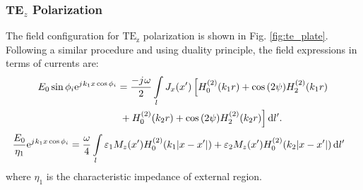 \subsubsection{TE$_z$ Polarization}
%
The field configuration for $\mathrm{TE_z}$ polarization is shown in Fig. \ref{fig:te_plate}. Following a similar procedure and using duality principle, the field expressions in terms of currents are:
%
\begin{align}
  E_0 \sin \phi_i  \mathrm{e}^{{j}\mkern1mu k_1 x \cos \phi_i} &=  \frac{-{j}\mkern1mu \omega}{2} \int\limits_{l} J_x(x') \left[ H_0^{(2)}(k_1 r) + \cos {(2 \psi)} H_2^{(2)}(k_1 r) \right. \notag\\
  & \left. {} + H_0^{(2)}(k_2 r) + \cos {(2\psi)} H_2^{(2)}(k_2 r)\right]\mathop{}\!\mathrm{d}{l'}.
  \label{eq:J_final}
\end{align}
%
\begin{align}
  \frac{E_0}{\eta_1} \mathrm{e}^{{j}\mkern1mu k_1 x \cos \phi_i} &=  \frac{\omega}{4} \int\limits_{l} \varepsilon_1 M_z(x') H_0^{(2)}(k_1 |x - x'|)  +  \varepsilon_2 M_z(x') H_0^{(2)}(k_2 |x - x'|) \mathop{}\!\mathrm{d}{l'}
  \label{eq:scalarH_final}
\end{align}
%
where $\eta_1$ is the characteristic impedance of external region.
